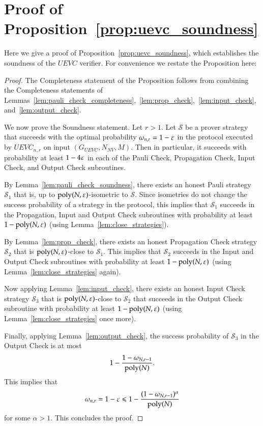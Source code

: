 \section{Proof of Proposition~\ref{prop:uevc_soundness}}
\label{sec:soundness}

Here we give a proof of Proposition~\ref{prop:uevc_soundness}, which establishes the soundness of the $UEVC$ verifier. For convenience we restate the Proposition here:

\soundness*

\begin{proof}
	
	The Completeness statement of the Proposition follows from combining the Completeness statements of Lemmas~\ref{lem:pauli_check_completeness},~\ref{lem:prop_check},~\ref{lem:input_check}, and~\ref{lem:output_check}.
	
	We now prove the Soundness statement. Let $r > 1$. Let $\mathcal{S}$ be a prover strategy that succeeds with the optimal probability $\omega_{n,r} = 1 - \varepsilon$ in the protocol executed by $UEVC_{n,r}$ on input $(G_{UEVC},N_{NV},M)$. Then in particular, it succeeds with probability at least $1 - 4\varepsilon$ in each of the Pauli Check, Propagation Check, Input Check, and Output Check subroutines. 
	
	By Lemma~\ref{lem:pauli_check_soundness}, there exists an honest Pauli strategy $\mathcal{S}_1$ that is, up to $\operatorname{poly}(N,\varepsilon)$-isometric to $\mathcal{S}$. Since isometries do not change the success probability of a strategy in the protocol, this implies that $\mathcal{S}_1$ succeeds in the Propagation, Input and Output Check subroutines with probability at least $1 - \operatorname{poly}(N,\varepsilon)$ (using Lemma~\ref{lem:close_strategies}).
	
	By Lemma~\ref{lem:prop_check}, there exists an honest Propagation Check strategy $\mathcal{S}_2$ that is $\operatorname{poly}(N,\varepsilon)$-close to $\mathcal{S}_1$. This implies that $\mathcal{S}_2$ succeeds in the Input and Output Check subroutines with probability at least $1 - \operatorname{poly}(N,\varepsilon)$ (using Lemma~\ref{lem:close_strategies} again).
	
	Now applying Lemma~\ref{lem:input_check}, there exists an honest Input Check strategy $\mathcal{S}_3$ that is $\operatorname{poly}(N,\varepsilon)$-close to $\mathcal{S}_2$ that succeeds in the Output Check subroutine with probability at least $1 - \operatorname{poly}(N,\varepsilon)$ (using Lemma~\ref{lem:close_strategies} once more).
	
	Finally, applying Lemma~\ref{lem:output_check}, the success probability of $\mathcal{S}_3$ in the Output Check is at most 
	\[
		1 - \frac{1 - \omega_{N,r-1}}{\operatorname{poly}(N)}.
	\]
	This implies that
	\[
		\omega_{n,r} = 1 - \varepsilon \leqslant 1 - \frac{(1 - \omega_{N,r-1})^\alpha}{\operatorname{poly}(N)}
	\]
	for some $\alpha > 1$. 
	This concludes the proof.
\end{proof}
